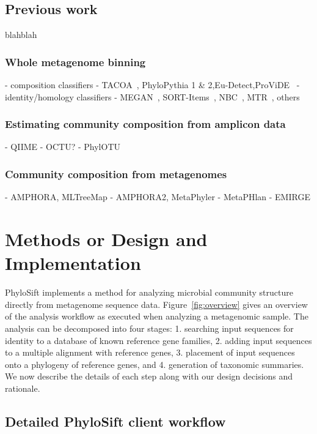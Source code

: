 \documentclass[10pt]{article}
\begin{document}
\subsection*{Previous work}
blahblah

\subsubsection*{Whole metagenome binning}
- composition classifiers
  - TACOA~\cite{Diaz2009}, PhyloPythia 1 \& 2\cite{Patil2011},Eu-Detect\cite{Mohammed2011},ProViDE~\cite{Ghosh2011}
- identity/homology classifiers
  - MEGAN~\cite{Huson2007}, SORT-Items~\cite{Haque2009}, NBC~\cite{Rosen2011}, MTR~\cite{Gori2011}, others
\subsubsection*{Estimating community composition from amplicon data}
      - QIIME
      - OCTU?
      - PhylOTU
\subsubsection*{Community composition from metagenomes}
      - AMPHORA\cite{WuEisen2008}, MLTreeMap\cite{Stark2010}
      - AMPHORA2, MetaPhyler
      - MetaPHlan
      - EMIRGE\cite{Miller2011}

\section*{Methods or Design and Implementation}

PhyloSift implements a method for analyzing microbial community structure directly from metagenome sequence data.
Figure~\ref{fig:overview} gives an overview of the analysis workflow as executed when analyzing a metagenomic sample.
The analysis can be decomposed into four stages: 1. searching input sequences for identity to a database of known reference gene families, 2. adding input sequences to a multiple alignment with reference genes, 3. placement of input sequences onto a phylogeny of reference genes, and 4. generation of taxonomic summaries. We now describe the details of each step along with our design decisions and rationale.
 

\subsection*{Detailed PhyloSift client workflow}
\end{document}
